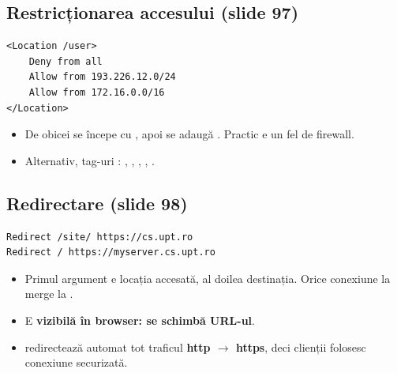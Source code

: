 \documentclass[11pt,a4paper]{article}
\begin{document}
\subsection*{Restricționarea accesului (slide 97)}
\begin{lstlisting}
<Location /user>
    Deny from all
    Allow from 193.226.12.0/24
    Allow from 172.16.0.0/16
</Location>
\end{lstlisting}
\begin{itemize}
  \item De obicei se începe cu , apoi se adaugă . Practic e un fel de firewall.
  \item Alternativ, tag-uri : , , , , .
\end{itemize}

\subsection*{Redirectare (slide 98)}
\begin{lstlisting}
Redirect /site/ https://cs.upt.ro
Redirect / https://myserver.cs.upt.ro
\end{lstlisting}
\begin{itemize}
  \item Primul argument e locația accesată, al doilea destinația. Orice conexiune la  merge la .
  \item E \textbf{vizibilă în browser: se schimbă URL-ul}.
  \item {} redirectează automat tot traficul \textbf{http $\rightarrow$ https}, deci clienții folosesc conexiune securizată.
\end{itemize}
\end{document}
